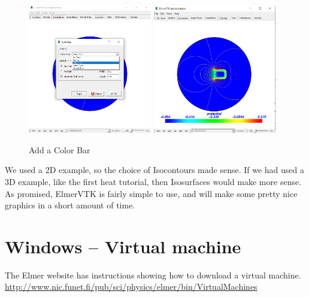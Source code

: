 \begin{figure}[H]
\begin{center}
\includegraphics[width=0.48\textwidth]{vtk-6}
\includegraphics[width=0.48\textwidth]{vtk-7}
\caption{Add a Color Bar}\label{fg:vtk-6}
\end{center}
\end{figure}

We used a 2D example, so the choice of Isocontours made sense.  If we had used a 3D example, like the first heat tutorial, then Isosurfaces would make more sense.\\

As promised, ElmerVTK is fairly simple to use, and will make some pretty nice graphics in a short amount of time.

\chapter{Windows -- Virtual machine}

The Elmer website has instructions showing how to download a virtual machine.\\

 \url{http://www.nic.funet.fi/pub/sci/physics/elmer/bin/VirtualMachines}\\

